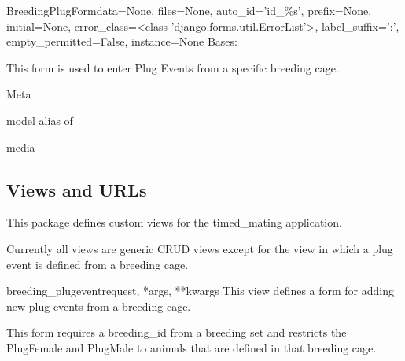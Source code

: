 \documentclass[letterpaper,10pt,english]{sphinxmanual}
\begin{document}
\hypertarget{timed\_mating.forms.BreedingPlugForm}{}\begin{classdesc}{BreedingPlugForm}{data=None, files=None, auto\_id='id\_\%s', prefix=None, initial=None, error\_class=\textless{}class 'django.forms.util.ErrorList'\textgreater{}, label\_suffix=':', empty\_permitted=False, instance=None}
Bases: 

This form is used to enter Plug Events from a specific breeding cage.

\hypertarget{timed\_mating.forms.BreedingPlugForm.Meta}{}\begin{classdesc}{Meta}{}~

\hypertarget{timed\_mating.forms.BreedingPlugForm.Meta.model}{}\begin{memberdesc}{model}
alias of 
\end{memberdesc}
\end{classdesc}

\hypertarget{timed\_mating.forms.BreedingPlugForm.media}{}\begin{memberdesc}[BreedingPlugForm]{media}\end{memberdesc}
\end{classdesc}


\subsection{Views and URLs}
\hypertarget{module-timed\_mating.views}{}
\modulesynopsis{}
This package defines custom views for the timed\_mating application.

Currently all views are generic CRUD views except for the view in which a plug event is defined from a breeding cage.

\hypertarget{timed\_mating.views.breeding\_plugevent}{}\begin{funcdesc}{breeding\_plugevent}{request, *args, **kwargs}
This view defines a form for adding new plug events from a breeding cage.

This form requires a breeding\_id from a breeding set and restricts the PlugFemale and PlugMale to animals that are defined in that breeding cage.
\end{funcdesc}
\hypertarget{module-timed\_mating.urls}{}
\modulesynopsis{}
\end{document}
